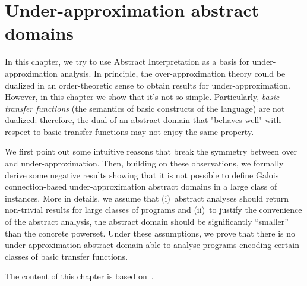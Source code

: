
\chapter{Under-approximation abstract domains}\label{ch:uai}
In this chapter, we try to use Abstract Interpretation as a basis for under-approximation analysis. In principle, the over-approximation theory could be dualized in an order-theoretic sense to obtain results for under-approximation. However, in this chapter we show that it's not so simple. Particularly, \emph{basic transfer functions} (the semantics of basic constructs of the language) are not dualized: therefore, the dual of an abstract domain that "behaves well" with respect to basic transfer functions may not enjoy the same property.

We first point out some intuitive reasons that break the symmetry between over and under-approximation. Then, building on these observations, we formally derive some negative results showing that it is not possible to define Galois connection-based under-approximation abstract domains in a large class of instances. More in details, we assume that (i)~abstract analyses should return non-trivial results for large classes of programs and (ii)~to justify the convenience of the abstract analysis, the abstract domain should be significantly “smaller” than the concrete powerset. Under these assumptions, we prove that there is no under-approximation abstract domain able to analyse programs encoding certain classes of basic transfer functions.

The content of this chapter is based on~\cite{ABG22,ABG24}.

